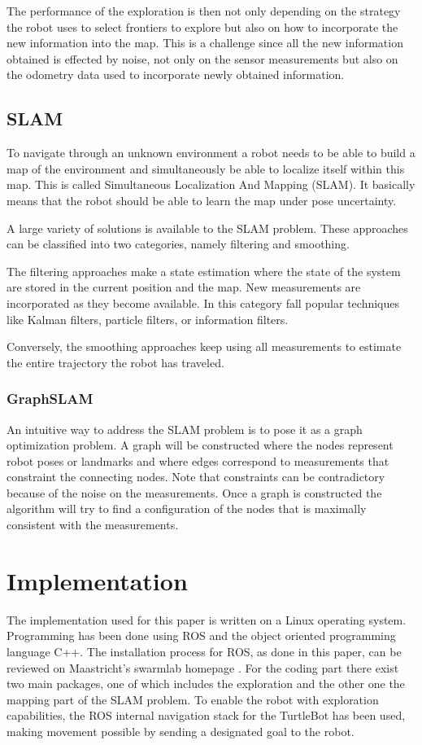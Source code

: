 \documentclass{ba-kecs}
\begin{document}
The performance of the exploration is then not only depending on the strategy the robot uses to select frontiers to explore but also on how to incorporate the new information into the map. This is a challenge since all the new information obtained is effected by noise, not only on the sensor measurements but also on the odometry data used to incorporate newly obtained information.

\subsection{SLAM}
To navigate through an unknown environment a robot needs to be able to build a map of the environment and simultaneously be able to localize itself within this map. This is called Simultaneous Localization And Mapping (SLAM). It basically means that the robot should be able to learn the map under pose uncertainty.

A large variety of solutions is available to the SLAM problem. These approaches can be classified into two categories, namely filtering and smoothing. 

The filtering approaches make a state estimation where the state of the system are stored in the current position and the map. New measurements are incorporated as they become available. In this category fall popular techniques like Kalman filters, particle filters, or information filters.

Conversely, the smoothing approaches keep using all measurements to estimate the entire trajectory the robot has traveled.

\subsubsection{GraphSLAM}
An intuitive way to address the SLAM problem is to pose it as a graph optimization problem. A graph will be constructed where the nodes represent robot poses or landmarks and where edges correspond to measurements that constraint the connecting nodes. Note that constraints can be contradictory because of the noise on the measurements. Once a graph is constructed the algorithm will try to find a configuration of the nodes that is maximally consistent with the measurements.

\section{Implementation}

The implementation used for this paper is written on a Linux operating system. Programming has been done using ROS and the object oriented programming language C++. The installation process for ROS, as done in this paper, can be reviewed on Maastricht's swarmlab homepage \cite{swarmlab}.
 For the coding part there exist two main packages, one of which includes the exploration and the other one the mapping part of the SLAM problem. To enable the robot with exploration capabilities, the ROS internal navigation stack for the TurtleBot has been used, making movement possible by sending a designated goal to the robot.
\end{document}
